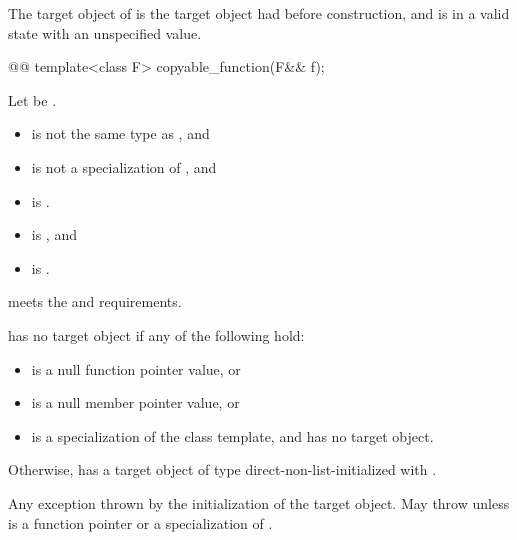 \begin{itemdescr}
\pnum
\ensures
The target object of  is
the target object  had before construction, and
 is in a valid state with an unspecified value.
\end{itemdescr}

%
\begin{itemdecl}
@@ template<class F> copyable_function(F&& f);
\end{itemdecl}

\begin{itemdescr}
\pnum
Let  be .

\pnum
\constraints
\begin{itemize}
\item
{} is not the same type as , and
\item
{} is not a specialization of , and
\item
{} is .
\end{itemize}

\pnum
\mandates
\begin{itemize}
\item
{} is , and
\item
{} is .
\end{itemize}

\pnum
\expects
{} meets the  and
 requirements.

\pnum
\ensures
{} has no target object if any of the following hold:
\begin{itemize}
\item
{} is a null function pointer value, or
\item
{} is a null member pointer value, or
\item
{} is a specialization of
the  class template,
and  has no target object.
\end{itemize}
Otherwise,  has a target object of type 
direct-non-list-initialized with .

\pnum
\throws
Any exception thrown by the initialization of the target object.
May throw  unless  is
a function pointer or a specialization of .
\end{itemdescr}

